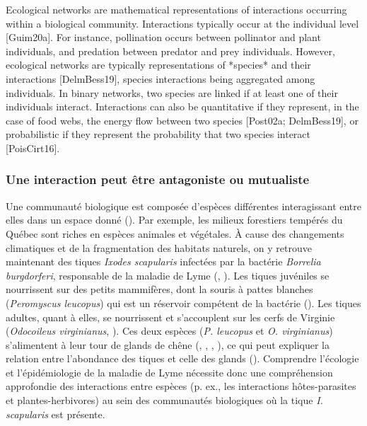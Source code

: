 Ecological networks are mathematical representations of interactions occurring
within a biological community. Interactions typically occur at the individual
level [Guim20a]. For instance, pollination occurs between pollinator and plant
individuals, and predation between predator and prey individuals. However,
ecological networks are typically representations of *species* and their
interactions [DelmBess19], species interactions being aggregated among
individuals. In binary networks, two species are linked if at least one of their
individuals interact. Interactions can also be quantitative if they represent,
in the case of food webs, the energy flow between two species [Post02a;
DelmBess19], or probabilistic if they represent the probability that two
species interact [PoisCirt16].

\subsubsection{Une interaction peut être antagoniste ou mutualiste} 

Une communauté biologique est composée d'espèces différentes interagissant entre
elles dans un espace donné (\cite{Stroud2015Community}). Par exemple, les
milieux forestiers tempérés du Québec sont riches en espèces animales et
végétales. À cause des changements climatiques et de la fragmentation des
habitats naturels, on y retrouve maintenant des tiques \textit{Ixodes
scapularis} infectées par la bactérie \textit{Borrelia burgdorferi}, responsable
de la maladie de Lyme (\cite{Ogden2009Emergence}, \cite{Simon2014Climate}). Les
tiques juvéniles se nourrissent sur des petits mammifères, dont la souris à
pattes blanches (\textit{Peromyscus leucopus}) qui est un réservoir compétent de
la bactérie (\cite{Donahue1987Reservoir}). Les tiques adultes, quant à elles, se
nourrissent et s'accouplent sur les cerfs de Virginie (\textit{Odocoileus
virginianus}, \cite{Lane1991Lyme}). Ces deux espèces (\textit{P. leucopus} et
\textit{O. virginianus}) s'alimentent à leur tour de glands de chêne
(\cite{McShea1993Variablea}, \cite{Elkinton1996Interactions},
\cite{Wolff1996Population}, \cite{McShea2000Influence}), ce qui peut expliquer
la relation entre l'abondance des tiques et celle des glands
(\cite{Ostfeld2006Climate}). Comprendre l'écologie et l'épidémiologie de la
maladie de Lyme nécessite donc une compréhension approfondie des interactions
entre espèces (p. ex., les interactions hôtes-parasites et plantes-herbivores)
au sein des communautés biologiques où la tique \textit{I. scapularis} est
présente.

